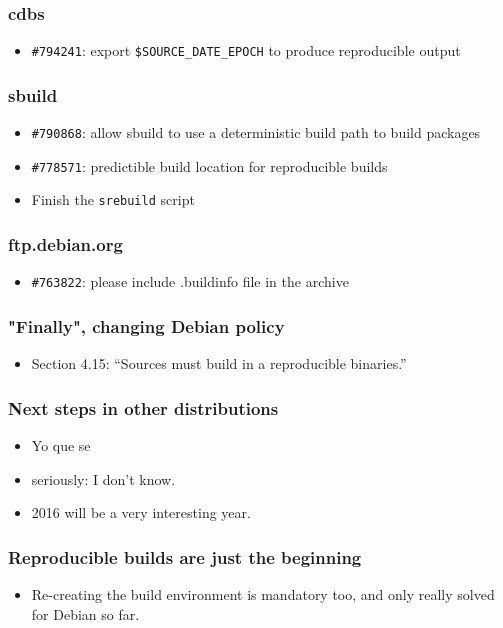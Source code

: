 \documentclass[14pt]{beamer}
\begin{document}
\begin{frame}
 \frametitle{cdbs}

 \begin{itemize}\small
  \item \texttt{\#794241}: export \texttt{\$SOURCE\_DATE\_EPOCH} to produce reproducible output
 \end{itemize}
\end{frame}

\begin{frame}
 \frametitle{sbuild}

 \begin{itemize}\small
  \item \texttt{\#790868}: allow sbuild to use a deterministic build path to build packages
  \item \texttt{\#778571}: predictible build location for reproducible builds
  \item Finish the \texttt{srebuild} script
 \end{itemize}
\end{frame}

\begin{frame}
 \frametitle{ftp.debian.org}

 \begin{itemize}\small
  \item \texttt{\#763822}: please include .buildinfo file in the archive
 \end{itemize}
\end{frame}

\begin{frame}
 \frametitle{"Finally", changing Debian policy}

 \begin{itemize}
  \item Section 4.15: “Sources must build in a reproducible binaries.” 
 \end{itemize}
\end{frame}


\begin{frame}
 \frametitle{Next steps in other distributions}
 \begin{itemize}
  \item Yo que se
  \item seriously: I don't know. 
  \item 2016 will be a very interesting year.
 \end{itemize}
\end{frame}

\begin{frame}
 \frametitle{Reproducible builds are just the beginning}
 \begin{itemize}
  \item Re-creating the build environment is mandatory too, and only really solved
  for Debian so far.
 \end{itemize}
\end{frame}
\end{document}
